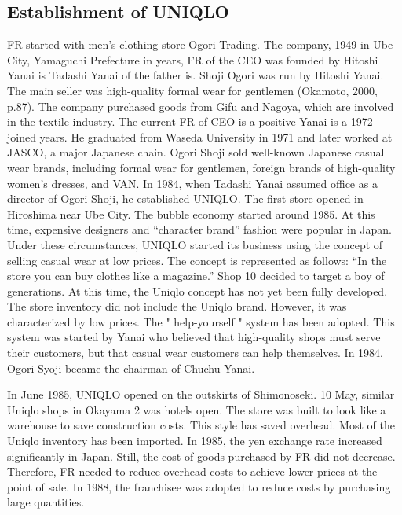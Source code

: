 \documentclass[12pt,]{article}
\begin{document}
\hypertarget{establishment-of-uniqlo}{%
\subsection{Establishment of UNIQLO}\label{establishment-of-uniqlo}}

FR started with men's clothing store Ogori Trading. The company, 1949 in
Ube City, Yamaguchi Prefecture in years, FR of the CEO was founded by
Hitoshi Yanai is Tadashi Yanai of the father is. Shoji Ogori was run by
Hitoshi Yanai. The main seller was high-quality formal wear for
gentlemen (Okamoto, 2000, p.87). The company purchased goods from Gifu
and Nagoya, which are involved in the textile industry. The current FR
of CEO is a positive Yanai is a 1972 joined years. He graduated from
Waseda University in 1971 and later worked at JASCO, a major Japanese
chain. Ogori Shoji sold well-known Japanese casual wear brands,
including formal wear for gentlemen, foreign brands of high-quality
women's dresses, and VAN. In 1984, when Tadashi Yanai assumed office as
a director of Ogori Shoji, he established UNIQLO. The first store opened
in Hiroshima near Ube City. The bubble economy started around 1985. At
this time, expensive designers and ``character brand'' fashion were
popular in Japan. Under these circumstances, UNIQLO started its business
using the concept of selling casual wear at low prices. The concept is
represented as follows: ``In the store you can buy clothes like a
magazine.'' Shop 10 decided to target a boy of generations. At this
time, the Uniqlo concept has not yet been fully developed. The store
inventory did not include the Uniqlo brand. However, it was
characterized by low prices. The " help-yourself " system has been
adopted. This system was started by Yanai who believed that high-quality
shops must serve their customers, but that casual wear customers can
help themselves. In 1984, Ogori Syoji became the chairman of Chuchu
Yanai.

In June 1985, UNIQLO opened on the outskirts of Shimonoseki. 10 May,
similar Uniqlo shops in Okayama 2 was hotels open. The store was built
to look like a warehouse to save construction costs. This style has
saved overhead. Most of the Uniqlo inventory has been imported. In 1985,
the yen exchange rate increased significantly in Japan. Still, the cost
of goods purchased by FR did not decrease. Therefore, FR needed to
reduce overhead costs to achieve lower prices at the point of sale. In
1988, the franchisee was adopted to reduce costs by purchasing large
quantities.
\end{document}
